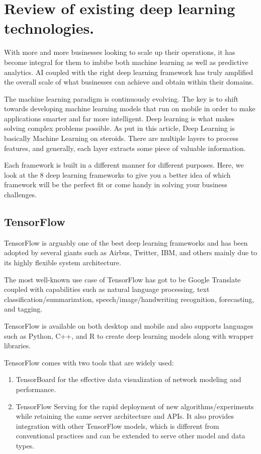 \section{Review of existing deep learning technologies.}

With more and more businesses looking to scale up their operations, it has become integral for them to imbibe both machine learning as well as predictive analytics. AI coupled with the right deep learning framework has truly amplified the overall scale of what businesses can achieve and obtain within their domains.

The machine learning paradigm is continuously evolving. The key is to shift towards developing machine learning models that run on mobile in order to make applications smarter and far more intelligent. Deep learning is what makes solving complex problems possible. As put in this article, Deep Learning is basically Machine Learning on steroids. There are multiple layers to process features, and generally, each layer extracts some piece of valuable information.

Each framework is built in a different manner for different purposes. Here, we look at the 8 deep learning frameworks to give you a better idea of which framework will be the perfect fit or come handy in solving your business challenges.

\subsection{TensorFlow}
TensorFlow is arguably one of the best deep learning frameworks and has been adopted by several giants such as Airbus, Twitter, IBM, and others mainly due to its highly flexible system architecture.

The most well-known use case of TensorFlow has got to be Google Translate coupled with capabilities such as natural language processing, text classification/summarization, speech/image/handwriting recognition, forecasting, and tagging.

TensorFlow is available on both desktop and mobile and also supports languages such as Python, C++, and R to create deep learning models along with wrapper libraries.

TensorFlow comes with two tools that are widely used:

\begin{enumerate}
    \item TensorBoard for the effective data visualization of network modeling and performance.
    \item TensorFlow Serving for the rapid deployment of new algorithms/experiments while retaining the same server architecture and APIs. It also provides integration with other TensorFlow models, which is different from conventional practices and can be extended to serve other model and data types.
\end{enumerate}


